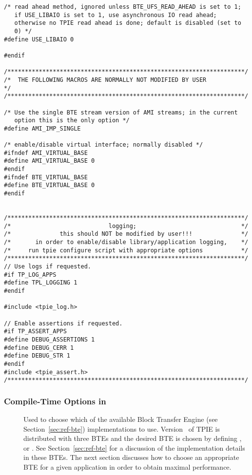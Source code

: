 \begin{verbatim}
/* read ahead method, ignored unless BTE_UFS_READ_AHEAD is set to 1;
   if USE_LIBAIO is set to 1, use asynchronous IO read ahead;
   otherwise no TPIE read ahead is done; default is disabled (set to
   0) */
#define USE_LIBAIO 0

#endif

/********************************************************************/
/*  THE FOLLOWING MACROS ARE NORMALLY NOT MODIFIED BY USER           */
/********************************************************************/

/* Use the single BTE stream version of AMI streams; in the current
   option this is the only option */
#define AMI_IMP_SINGLE

/* enable/disable virtual interface; normally disabled */
#ifndef AMI_VIRTUAL_BASE
#define AMI_VIRTUAL_BASE 0
#endif
#ifndef BTE_VIRTUAL_BASE 
#define BTE_VIRTUAL_BASE 0
#endif


/********************************************************************/
/*                            logging;                              */
/*              this should NOT be modified by user!!!              */
/*       in order to enable/disable library/application logging,    */
/*     run tpie configure script with appropriate options           */
/********************************************************************/
// Use logs if requested.
#if TP_LOG_APPS
#define TPL_LOGGING 1
#endif

#include <tpie_log.h>

// Enable assertions if requested.
#if TP_ASSERT_APPS
#define DEBUG_ASSERTIONS 1
#define DEBUG_CERR 1
#define DEBUG_STR 1
#endif
#include <tpie_assert.h>
/********************************************************************/
\end{verbatim}

\subsubsection{Compile-Time Options in }

\begin{description}
    \item[{}] 
    \item[{}]
    \item[{}] Used to choose which of
    the available Block Transfer Engine (see
    Section~\ref{sec:ref-bte}) implementations to use.
    Version \version~of TPIE is distributed with three BTEs
    and the desired BTE is chosen by defining
    ,  or
    . See Section~\ref{sec:ref-bte}
    for a discussion of the implementation details in these
    BTEs. The next section discusses how to choose an
    appropriate BTE for a given application in order to
    obtain maximal performance.

\end{description}

